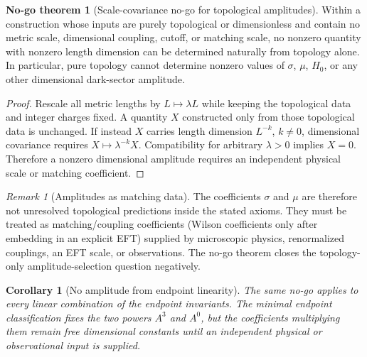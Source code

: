 \documentclass[11pt,a4paper]{article}
\numberwithin{equation}{section}
\theoremstyle{definition}
\newtheorem{nogotheorem}[criterion]{No-go theorem}
\theoremstyle{plain}
\newtheorem{corollary}[criterion]{Corollary}
\theoremstyle{remark}
\newtheorem{remark}[criterion]{Remark}
\begin{document}
\begin{nogotheorem}[Scale-covariance no-go for topological amplitudes]
Within a construction whose inputs are purely topological or dimensionless and contain no metric scale, dimensional coupling, cutoff, or matching scale, no nonzero quantity with nonzero length dimension can be determined naturally from topology alone. In particular, pure topology cannot determine nonzero values of \(\sigma\), \(\mu\), \(H_0\), or any other dimensional dark-sector amplitude.
\end{nogotheorem}
\begin{proof}
Rescale all metric lengths by \(L\mapsto\lambda L\) while keeping the topological data and integer charges fixed. A quantity \(X\) constructed only from those topological data is unchanged. If instead \(X\) carries length dimension \(L^{-k}\), \(k\neq0\), dimensional covariance requires \(X\mapsto\lambda^{-k}X\). Compatibility for arbitrary \(\lambda>0\) implies \(X=0\). Therefore a nonzero dimensional amplitude requires an independent physical scale or matching coefficient.
\end{proof}

\begin{remark}[Amplitudes as matching data]
The coefficients \(\sigma\) and \(\mu\) are therefore not unresolved topological predictions inside the stated axioms. They must be treated as matching/coupling coefficients (Wilson coefficients only after embedding in an explicit EFT) supplied by microscopic physics, renormalized couplings, an EFT scale, or observations. The no-go theorem closes the topology-only amplitude-selection question negatively.
\end{remark}

\begin{corollary}[No amplitude from endpoint linearity]
The same no-go applies to every linear combination of the endpoint invariants. The minimal endpoint classification fixes the two powers \(A^3\) and \(A^0\), but the coefficients multiplying them remain free dimensional constants until an independent physical or observational input is supplied.
\end{corollary}
\end{document}
